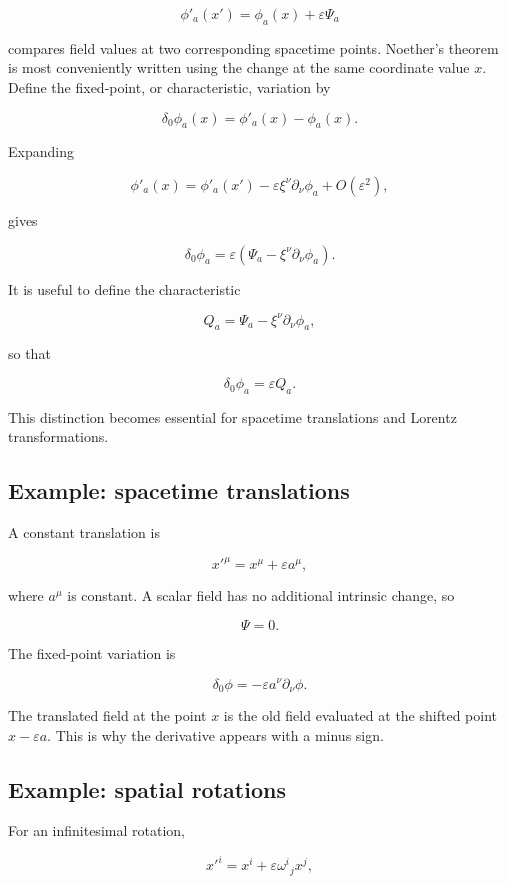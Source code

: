 \[
\phi'_a(x')
=
\phi_a(x)
+
\varepsilon\Psi_a
\]

compares field values at two corresponding spacetime points. Noether's theorem is most conveniently written using the change at the same coordinate value \(x\). Define the fixed-point, or characteristic, variation by

\[
\boxed{
\delta_0\phi_a(x)
=
\phi'_a(x)-\phi_a(x)
}.
\]

Expanding

\[
\phi'_a(x)
=
\phi'_a(x')
-
\varepsilon\xi^{\nu}\partial_{\nu}\phi_a
+
O(\varepsilon^{2}),
\]

gives

\[
\boxed{
\delta_0\phi_a
=
\varepsilon
\left(
\Psi_a
-
\xi^{\nu}\partial_{\nu}\phi_a
\right)
}.
\]

It is useful to define the characteristic

\[
\boxed{
Q_a
=
\Psi_a
-
\xi^{\nu}\partial_{\nu}\phi_a
},
\]

so that

\[
\delta_0\phi_a
=
\varepsilon Q_a.
\]

This distinction becomes essential for spacetime translations and Lorentz transformations.

\subsection{Example: spacetime translations}

A constant translation is

\[
x'^{\mu}
=
x^{\mu}
+
\varepsilon a^{\mu},
\]

where \(a^{\mu}\) is constant. A scalar field has no additional intrinsic change, so

\[
\Psi=0.
\]

The fixed-point variation is

\[
\boxed{
\delta_0\phi
=
-\varepsilon a^{\nu}\partial_{\nu}\phi
}.
\]

The translated field at the point \(x\) is the old field evaluated at the shifted point \(x-\varepsilon a\). This is why the derivative appears with a minus sign.

\subsection{Example: spatial rotations}

For an infinitesimal rotation,

\[
x'^{i}
=
x^{i}
+
\varepsilon \omega^{i}{}_{j}x^{j},
\]

